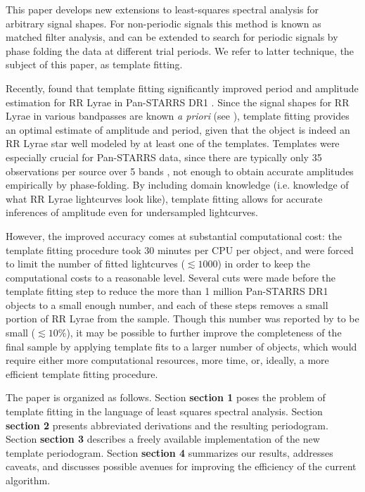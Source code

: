 \documentclass[iop]{emulateapj}
\newcommand{\todo}[1]{{\bf #1}}
\begin{document}
This paper develops new extensions to least-squares spectral analysis for arbitrary
signal shapes. For non-periodic signals this method is known as matched filter analysis,
and can be extended to search for periodic signals by phase folding the data
at different trial periods. We refer to latter technique, the subject of this paper, as
template fitting. 

Recently, \cite{Sesar_etal_2016} found that template fitting significantly improved
period and amplitude estimation for RR Lyrae in Pan-STARRS DR1 \citep{PanSTARRS}. Since the signal
shapes for RR Lyrae in various bandpasses are known \emph{a priori} (see \cite{Sesar_etal_2010}), 
template fitting provides an optimal estimate of amplitude and period,
given that the object is indeed an RR Lyrae star well modeled by at least one of the templates. 
Templates were especially crucial for Pan-STARRS data, since there are typically only 
35 observations per source over 5 bands \citep{Hernitschek_etal_2016}, not enough to obtain 
accurate amplitudes empirically by phase-folding. By including domain knowledge (i.e. knowledge of what RR Lyrae 
lightcurves look like), template fitting allows for accurate inferences of amplitude even 
for undersampled lightcurves.

However, the improved accuracy comes at substantial computational cost: the template fitting 
procedure took 30 minutes per CPU per object, and \cite{Sesar_etal_2016} were forced to limit
the number of fitted lightcurves ($\lesssim 1000$) in order to keep the computational costs
to a reasonable level. Several cuts were made before the template fitting step to reduce the
more than 1 million Pan-STARRS DR1 objects to a small enough number, and each of these steps
removes a small portion of RR Lyrae from the sample. Though this number was reported by
\cite{Sesar_etal_2016} to be small ($\lesssim 10\%$), it may be possible to further improve
the completeness of the final sample by applying template fits to a larger number of objects,
which would require either more computational resources, more time, or, ideally, a more efficient
template fitting procedure.

The paper is organized as follows. Section \todo{section 1} poses the problem of template
fitting in the language of least squares spectral analysis. Section \todo{section 2} presents
abbreviated derivations and the resulting periodogram. Section \todo{section 3} describes
a freely available implementation of the new template periodogram. Section \todo{section 4}
summarizes our results, addresses caveats, and discusses possible avenues for improving
the efficiency of the current algorithm.
\end{document}
